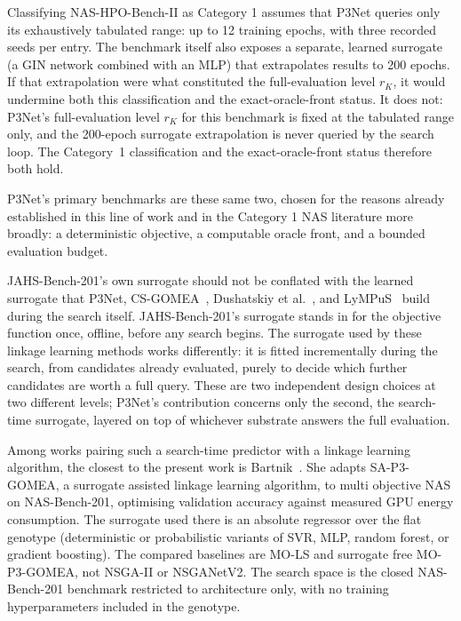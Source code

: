 Classifying NAS-HPO-Bench-II as Category 1 assumes that P3Net queries only its exhaustively tabulated range: up to 12 training epochs, with three recorded seeds per entry. The benchmark itself also exposes a separate, learned surrogate (a GIN network combined with an MLP) that extrapolates results to 200 epochs. If that extrapolation were what constituted the full-evaluation level $r_K$, it would undermine both this classification and the exact-oracle-front status. It does not: P3Net's full-evaluation level $r_K$ for this benchmark is fixed at the tabulated range only, and the 200-epoch surrogate extrapolation is never queried by the search loop. The Category~1 classification and the exact-oracle-front status therefore both hold.

P3Net's primary benchmarks are these same two, chosen for the reasons already established in this line of work and in the Category 1 NAS literature more broadly: a deterministic objective, a computable oracle front, and a bounded evaluation budget.

JAHS-Bench-201's own surrogate should not be conflated with the learned surrogate that P3Net, CS-GOMEA~\citep{dushatskiy2019csgomea}, Dushatskiy et al.~\citep{dushatskiy2021novelsurrogateassistedevolutionaryalgorithm}, and LyMPuS~\citep{przewozniczek2026lympus} build during the search itself. JAHS-Bench-201's surrogate stands in for the objective function once, offline, before any search begins. The surrogate used by these linkage learning methods works differently: it is fitted incrementally during the search, from candidates already evaluated, purely to decide which further candidates are worth a full query. These are two independent design choices at two different levels; P3Net's contribution concerns only the second, the search-time surrogate, layered on top of whichever substrate answers the full evaluation.

Among works pairing such a search-time predictor with a linkage learning algorithm, the closest to the present work is Bartnik~\citep{bartnik2026evolutionary}. She adapts SA-P3-GOMEA, a surrogate assisted linkage learning algorithm, to multi objective NAS on NAS-Bench-201, optimising validation accuracy against measured GPU energy consumption. The surrogate used there is an absolute regressor over the flat genotype (deterministic or probabilistic variants of SVR, MLP, random forest, or gradient boosting). The compared baselines are MO-LS and surrogate free MO-P3-GOMEA, not NSGA-II or NSGANetV2. The search space is the closed NAS-Bench-201 benchmark restricted to architecture only, with no training hyperparameters included in the genotype.

